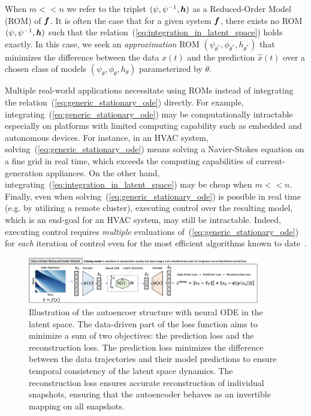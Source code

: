 When $m << n$ we refer to the triplet $(\psi, \psi^{-1}, \boldsymbol{h})$ as a Reduced-Order Model (ROM) of $\boldsymbol{f}$. It is often the case that for a given system $\boldsymbol{f}$, there exists no ROM $(\psi, \psi^{-1}, \boldsymbol{h})$ such that the relation~(\ref{eq:integration_in_latent_space}) holds exactly. In this case, we seek an \textit{approximation} ROM $(\psi_{\theta^*}, \phi_{\theta^*}, h_{\theta^*})$ that minimizes the difference between the data $x(t)$ and the prediction $\hat{x}(t)$ over a chosen class of models $(\psi_\theta, \phi_\theta, h_\theta)$ parameterized by $\theta$.

Multiple real-world applications necessitate using ROMs instead of integrating the relation~(\ref{eq:generic_stationary_ode}) directly. For example, integrating~(\ref{eq:generic_stationary_ode}) may be computationally intractable especially on platforms with limited computing capability such as embedded and autonomous devices. For instance, in an HVAC system, solving~(\ref{eq:generic_stationary_ode}) means solving a Navier-Stokes equation on a fine grid in real time, which exceeds the computing capabilities of current-generation appliances. On the other hand, integrating~(\ref{eq:integration_in_latent_space}) may be cheap when $m << n$. Finally, even when solving~(\ref{eq:generic_stationary_ode}) is possible in real time (e.g. by utilizing a remote cluster), executing control over the resulting model, which is an end-goal for an HVAC system, may still be intractable. Indeed, executing control requires \textit{multiple} evaluations of~(\ref{eq:generic_stationary_ode}) for \textit{each} iteration of control even for the most efficient algorithms known to date~\cite{duriez2017machine}. 

\begin{figure}
    \centering
    \includegraphics[width=0.9\textwidth]{figures/abstract_data_driven.png}
    \caption{Illustration of the autoencoer structure with neural ODE in the latent space. The data-driven part of the loss function aims to minimize a sum of two objectives: the prediction loss and the reconstruction loss. The prediction loss minimizes the difference between the data trajectories and their model predictions to ensure temporal consistency of the latent space dynamics. The reconstruction loss ensures accurate reconstruction of individual snapshots, ensuring that the autoencoder behaves as an invertible mapping on all snapshots.}
    \label{fig:data_driven_loss}
\end{figure}

